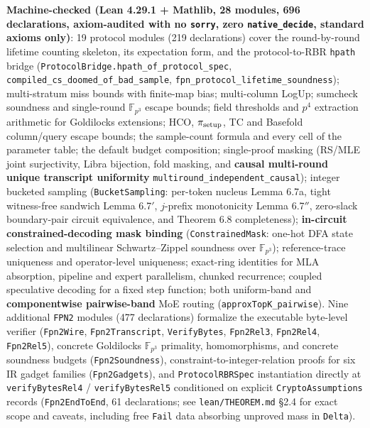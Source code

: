 \documentclass[10pt]{article}
\begin{document}
\textbf{Machine-checked (Lean 4.29.1 + Mathlib, 28 modules, 696 declarations, axiom-audited with no \texttt{sorry}, zero \texttt{native\_\allowbreak{}decide}, standard axioms only)}: 19 protocol modules (219 declarations) cover the round-by-round lifetime counting skeleton, its expectation form, and the protocol-to-RBR \texttt{hpath} bridge (\texttt{ProtocolBridge.\allowbreak{}hpath\_\allowbreak{}of\_\allowbreak{}protocol\_\allowbreak{}spec}, \texttt{compiled\_\allowbreak{}cs\_\allowbreak{}doomed\_\allowbreak{}of\_\allowbreak{}bad\_\allowbreak{}sample}, \texttt{fpn\_\allowbreak{}protocol\_\allowbreak{}lifetime\_\allowbreak{}soundness}); multi-stratum miss bounds with finite-map bias; multi-column LogUp; sumcheck soundness and single-round $\mathbb F_{p^3}$ escape bounds; field thresholds and $p^4$ extraction arithmetic for Goldilocks extensions; HCO, $\pi_{\rm setup}$, TC and Basefold column/query escape bounds; the sample-count formula and every cell of the parameter table; the default budget composition; single-proof masking (RS/MLE joint surjectivity, Libra bijection, fold masking, and \textbf{causal multi-round unique transcript uniformity} \texttt{multiround\_\allowbreak{}independent\_\allowbreak{}causal}); integer bucketed sampling (\texttt{BucketSampling}: per-token nucleus Lemma 6.7a, tight witness-free sandwich Lemma 6.7$'$, $j$-prefix monotonicity Lemma 6.7$''$, zero-slack boundary-pair circuit equivalence, and Theorem 6.8 completeness); \textbf{in-circuit constrained-decoding mask binding} (\texttt{ConstrainedMask}: one-hot DFA state selection and multilinear Schwartz--Zippel soundness over $\mathbb F_{p^3}$); reference-trace uniqueness and operator-level uniqueness; exact-ring identities for MLA absorption, pipeline and expert parallelism, chunked recurrence; coupled speculative decoding for a fixed step function; both uniform-band and \textbf{componentwise pairwise-band} MoE routing (\texttt{approxTopK\_\allowbreak{}pairwise}). Nine additional \texttt{FPN2} modules (477 declarations) formalize the executable byte-level verifier (\texttt{Fpn2Wire}, \texttt{Fpn2Transcript}, \texttt{VerifyBytes}, \texttt{Fpn2Rel3}, \texttt{Fpn2Rel4}, \texttt{Fpn2Rel5}), concrete Goldilocks $\mathbb F_{p^3}$ primality, homomorphisms, and concrete soundness budgets (\texttt{Fpn2Soundness}), constraint-to-integer-relation proofs for six IR gadget families (\texttt{Fpn2Gadgets}), and \texttt{ProtocolRBRSpec} instantiation directly at \texttt{verifyBytesRel4} / \texttt{verifyBytesRel5} conditioned on explicit \texttt{CryptoAssumptions} records (\texttt{Fpn2EndToEnd}, 61 declarations; see \texttt{lean/THEOREM.\allowbreak{}md} \S{}2.4 for exact scope and caveats, including free \texttt{Fail} data absorbing unproved mass in \texttt{Delta}).
\end{document}
